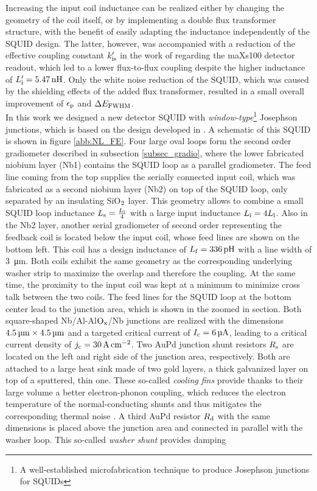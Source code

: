 Increasing the input coil inductance can be realized either by changing the geometry of the coil itself, or by implementing a double flux transformer structure, with the benefit of easily adapting the inductance independently of the SQUID design. The latter, however, was accompanied with a reduction of the effective coupling constant $k_{\rm is}'$ in the work of \cite{Bauer2022} regarding the maXs100 detector readout, which led to a lower flux-to-flux coupling despite the higher inductance of $L_{\rm i}'=\qty{5.47}{\nano\henry}$. Only the white noise reduction of the SQUID, which was caused by the shielding effects of the added flux transformer, resulted in a small overall improvement of $\epsilon_{\rm p}$ and $\Delta E_{\rm FWHM}$. \\
In this work we designed a new detector SQUID with \textit{window-type}\footnote{A well-established microfabrication technique to produce Josephson junctions for SQUIDs} Josephson junctions, which is based on the design developed in \cite{Bauer2022}. A schematic of this SQUID is shown in figure \ref{abb:NL_FE}. Four large oval loops form the second order gradiometer described in subsection \ref{subsec_gradio}, where the lower fabricated niobium layer (Nb1) contains the SQUID loop as a parallel gradiometer. The feed line coming from the top supplies the serially connected input coil, which was fabricated as a second niobium layer (Nb2) on top of the SQUID loop, only separated by an insulating SiO$_{\rm 2}$ layer. This geometry allows to combine a small SQUID loop inductance $L_{\rm s}=\frac{L_{\rm l}}{4}$ with a large input inductance $L_{\rm i}=4L_{\rm l}$. Also in the Nb2 layer, another serial gradiometer of second order representing the feedback coil is located below the input coil, whose feed lines are shown on the bottom left. This coil has a design inductance of $L_{\rm f}=\qty{336}{\pico\henry}$ with a line width of \qty{3}{\micro\meter}. Both coils exhibit the same geometry as the corresponding underlying washer strip to maximize the overlap and therefore the coupling. At the same time, the proximity to the input coil was kept at a minimum to minimize cross talk between the two coils. The feed lines for the SQUID loop at the bottom center lead to the junction area, which is shown in the zoomed in section. Both square-shaped Nb/Al-Al$\rm O_x$/Nb junctions are realized with the dimensions $\qtyproduct{4.5 x 4.5}{\micro\meter}$ and a targeted critical current of $I_{\rm c}=\qty{6}{\micro\ampere}$, leading to a critical current density of $j_{\rm c}=\qty{30}{\ampere\per\centi\meter\squared}$. Two AuPd junction shunt resistors $R_{\rm s}$ are located on the left and right side of the junction area, respectively. Both are attached to a large heat sink made of two gold layers, a thick galvanized layer on top of a sputtered, thin one. These so-called \textit{cooling fins} provide thanks to their large volume a better electron-phonon coupling, which reduces the electron temperature of the normal-conducting shunts and thus mitigates the corresponding thermal noise \cite{Mazibrada2024}. A third AuPd resistor $R_{\rm d}$ with the same dimensions is placed above the junction area and connected in parallel with the washer loop. This so-called \textit{washer shunt} provides damping 